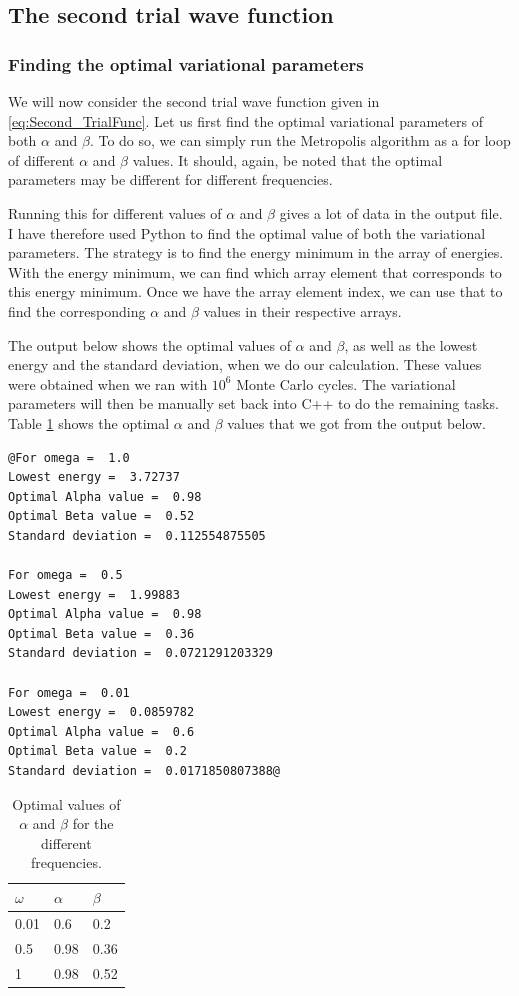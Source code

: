 \documentclass[12pt]{article}
\begin{document}
  
\FloatBarrier
\subsection{The second trial wave function}
\subsubsection{Finding the optimal variational parameters}
We will now consider the second trial wave function given in  \ref{eq:Second_TrialFunc}. Let us first find the optimal variational parameters of both $\alpha$ and $\beta$. To do so, we can simply run the Metropolis algorithm as a for loop of different $\alpha$ and $\beta$ values. It should, again, be noted that the optimal parameters may be different for different frequencies.

Running this for different values of $\alpha$ and $\beta$ gives a lot of data in the output file. I have therefore used Python to find the optimal value of both the variational parameters. The strategy is to find the energy minimum in the array of energies. With the energy minimum, we can find which array element that corresponds to this energy minimum. Once we have the array element index, we can use that to find the corresponding $\alpha$ and $\beta$ values in their respective arrays.

The output below shows the optimal values of $\alpha$ and $\beta$, as well as the lowest energy and the standard deviation, when we do our calculation. These values were obtained when we ran with $10^6$ Monte Carlo cycles. The variational parameters will then be manually set back into C++ to do the remaining tasks. Table \ref{table:Optimal_AlphaBeta} shows the optimal $\alpha$ and $\beta$ values that we got from the output below.
\begin{lstlisting}
@For omega =  1.0
Lowest energy =  3.72737
Optimal Alpha value =  0.98
Optimal Beta value =  0.52
Standard deviation =  0.112554875505

For omega =  0.5
Lowest energy =  1.99883
Optimal Alpha value =  0.98
Optimal Beta value =  0.36
Standard deviation =  0.0721291203329

For omega =  0.01
Lowest energy =  0.0859782
Optimal Alpha value =  0.6
Optimal Beta value =  0.2
Standard deviation =  0.0171850807388@
\end{lstlisting}

\begin{table}
\begin{center}
	\begin{tabular}{| l | l | l |}
	\hline
	 $\omega$ & $\alpha$ & $\beta$ \\ \hline
	 0.01 & 0.6 & 0.2 \\
	 0.5 & 0.98 & 0.36 \\
	 1 & 0.98 & 0.52 \\ \hline
	\end{tabular}
\caption{Optimal values of $\alpha$ and $\beta$ for the different frequencies.}
\end{center}
\label{table:Optimal_AlphaBeta}
\end{table}
\end{document}
